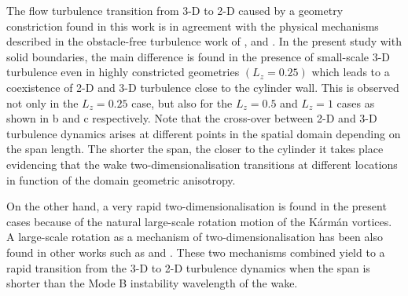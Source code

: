 \documentclass[../main.tex]{subfiles}
\begin{document}
The flow turbulence transition from 3-D to 2-D caused by a geometry constriction found in this work is in agreement with the physical mechanisms described in the obstacle-free turbulence work of \cite{Smith1996}, \cite{Celani2010} and \cite{Biancofiore2014}.
In the present study with solid boundaries, the main difference is found in the presence of small-scale 3-D turbulence even in highly constricted geometries $\left(L_z=0.25\right)$ which leads to a coexistence of 2-D and 3-D turbulence close to the cylinder wall.
This is observed not only in the $L_z=0.25$ case, but also for the $L_z=0.5$ and $L_z=1$ cases as shown in b and c respectively.
Note that the cross-over between 2-D and 3-D turbulence dynamics arises at different points in the spatial domain depending on the span length.
The shorter the span, the closer to the cylinder it takes place evidencing that the wake two-dimensionalisation transitions at different locations in function of the domain geometric anisotropy.

On the other hand, a very rapid two-dimensionalisation is found in the present cases because of the natural large-scale rotation motion of the K\'{a}rm\'{a}n vortices.
A large-scale rotation as a mechanism of two-dimensionalisation has been also found in other works such as \cite{Smith1996} and \cite{Xia2011}.
These two mechanisms combined yield to a rapid transition from the 3-D to 2-D turbulence dynamics when the span is shorter than the Mode B instability wavelength of the wake.
\end{document}
